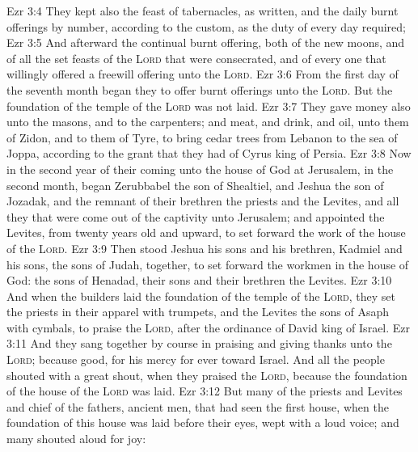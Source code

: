 \vs Ezr 3:4 They kept also the feast of tabernacles, as  written, and  the daily burnt offerings by number, according to the custom, as the duty of every day required;
\vs Ezr 3:5 And afterward  the continual burnt offering, both of the new moons, and of all the set feasts of the \textsc{Lord} that were consecrated, and of every one that willingly offered a freewill offering unto the \textsc{Lord}.
\vs Ezr 3:6 From the first day of the seventh month began they to offer burnt offerings unto the \textsc{Lord}. But the foundation of the temple of the \textsc{Lord} was not  laid.
\vs Ezr 3:7 They gave money also unto the masons, and to the carpenters; and meat, and drink, and oil, unto them of Zidon, and to them of Tyre, to bring cedar trees from Lebanon to the sea of Joppa, according to the grant that they had of Cyrus king of Persia.
\vs Ezr 3:8 Now in the second year of their coming unto the house of God at Jerusalem, in the second month, began Zerubbabel the son of Shealtiel, and Jeshua the son of Jozadak, and the remnant of their brethren the priests and the Levites, and all they that were come out of the captivity unto Jerusalem; and appointed the Levites, from twenty years old and upward, to set forward the work of the house of the \textsc{Lord}.
\vs Ezr 3:9 Then stood Jeshua  his sons and his brethren, Kadmiel and his sons, the sons of Judah, together, to set forward the workmen in the house of God: the sons of Henadad,  their sons and their brethren the Levites.
\vs Ezr 3:10 And when the builders laid the foundation of the temple of the \textsc{Lord}, they set the priests in their apparel with trumpets, and the Levites the sons of Asaph with cymbals, to praise the \textsc{Lord}, after the ordinance of David king of Israel.
\vs Ezr 3:11 And they sang together by course in praising and giving thanks unto the \textsc{Lord}; because  good, for his mercy  for ever toward Israel. And all the people shouted with a great shout, when they praised the \textsc{Lord}, because the foundation of the house of the \textsc{Lord} was laid.
\vs Ezr 3:12 But many of the priests and Levites and chief of the fathers,  ancient men, that had seen the first house, when the foundation of this house was laid before their eyes, wept with a loud voice; and many shouted aloud for joy:
